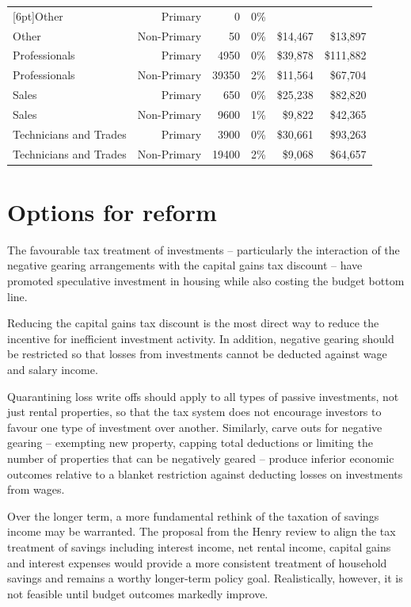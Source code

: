 \documentclass{grattan}\usepackage[]{graphicx}\usepackage[]{color}
\begin{document}
\begin{table}
\begin{tabularx}{\linewidth}{lrrrrr}
   [6pt]Other & Primary & 0 & 0\% &  &  \\ 
  Other & Non-Primary & 50 & 0\% & \$14,467 & \$13,897 \\ 
   [6pt]Professionals & Primary & 4950 & 0\% & \$39,878 & \$111,882 \\ 
  Professionals & Non-Primary & 39350 & 2\% & \$11,564 & \$67,704 \\ 
   [6pt]Sales & Primary & 650 & 0\% & \$25,238 & \$82,820 \\ 
  Sales & Non-Primary & 9600 & 1\% & \$9,822 & \$42,365 \\ 
   [6pt]Technicians and Trades & Primary & 3900 & 0\% & \$30,661 & \$93,263 \\ 
  Technicians and Trades & Non-Primary & 19400 & 2\% & \$9,068 & \$64,657 \\ 
   \bottomrule
\end{tabularx}

\end{table}

\chapter{Options for reform}
The favourable tax treatment of investments -- particularly the interaction of the negative gearing arrangements with the capital gains tax discount -- have promoted speculative investment in housing while also costing the budget bottom line. 

Reducing the capital gains tax discount is the most direct way to reduce the incentive for inefficient investment activity. In addition, negative gearing should be restricted so that losses from investments cannot be deducted against wage and salary income. 

Quarantining loss write offs should apply to all types of passive investments, not just rental properties, so that the tax system does not encourage investors to favour one type of investment over another. Similarly, carve outs for negative gearing -- exempting new property, capping total deductions or limiting the number of properties that can be negatively geared -- produce inferior economic outcomes relative to a blanket restriction against deducting losses on investments from wages.

Over the longer term, a more fundamental rethink of the taxation of savings income may be warranted. The proposal from the Henry review to align the tax treatment of savings including interest income, net rental income, capital gains and interest expenses would provide a more consistent treatment of household savings and remains a worthy longer-term policy goal.  Realistically, however, it is not feasible until budget outcomes markedly improve.
\end{document}
